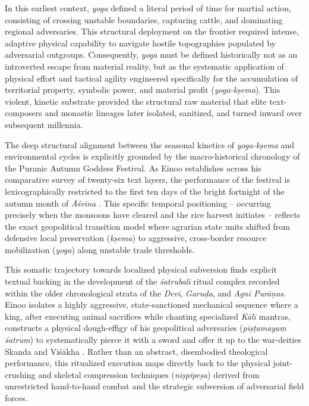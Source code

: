 \documentclass[11pt,twoside,letterpaper]{article}
\begin{document}
In this earliest context, \textit{yoga} defined a literal period of time for martial action, consisting of crossing unstable boundaries, capturing cattle, and dominating regional adversaries. This structural deployment on the frontier required intense, adaptive physical capability to navigate hostile topographies populated by adversarial outgroups. Consequently, \textit{yoga} must be defined historically not as an introverted escape from material reality, but as the systematic application of physical effort and tactical agility engineered specifically for the accumulation of territorial property, symbolic power, and material profit (\textit{yoga-k\d{s}ema}). This violent, kinetic substrate provided the structural raw material that elite text-composers and monastic lineages later isolated, sanitized, and turned inward over subsequent millennia.

The deep structural alignment between the seasonal kinetics of \textit{yoga-k\d{s}ema} and environmental cycles is explicitly grounded by the macro-historical chronology of the Puranic Autumn Goddess Festival. As Einoo establishes across his comparative survey of twenty-six text layers, the performance of the festival is lexicographically restricted to the first ten days of the bright fortnight of the autumn month of \textit{\={A}\'svina} \citep{Einoo1999}. This specific temporal positioning -- occurring precisely when the monsoons have cleared and the rice harvest initiates -- reflects the exact geopolitical transition model where agrarian state units shifted from defensive local preservation (\textit{k\d{s}ema}) to aggressive, cross-border resource mobilization (\textit{yoga}) along unstable trade thresholds.

This somatic trajectory towards localized physical subversion finds explicit textual backing in the development of the \textit{\'satrubali} ritual complex recorded within the older chronological strata of the \textit{Dev\={i}}, \textit{Garu\d{d}a}, and \textit{Agni Pur\={a}\d{n}as}. Einoo isolates a highly aggressive, state-sanctioned mechanical sequence where a king, after executing animal sacrifices while chanting specialized \textit{K\={a}l\={i}} mantras, constructs a physical dough-effigy of his geopolitical adversaries (\textit{p\={i}\d{s}\d{t}amaya\d{m} \'satrum}) to systematically pierce it with a sword and offer it up to the war-deities Skanda and Vi\'s\={a}kha \citep{Einoo1999}. Rather than an abstract, disembodied theological performance, this ritualized execution maps directly back to the physical joint-crushing and skeletal compression techniques (\textit{ni\d{s}pipe\d{s}a}) derived from unrestricted hand-to-hand combat and the strategic subversion of adversarial field forces.
\end{document}
